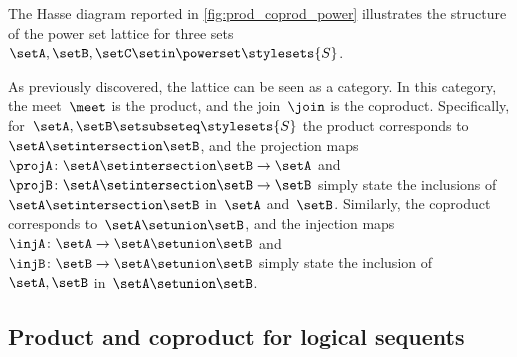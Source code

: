 \begin{marginfigure}
    \centering
    \caption{}
    \label{fig:prod_coprod_power}
\end{marginfigure}

The Hasse diagram reported in \cref{fig:prod_coprod_power} illustrates the structure of the power set lattice for three sets~$\setA,\setB,\setC\setin \powerset \stylesets{S}$.

As previously discovered, the lattice can be seen as a category.
In this category, the meet~$\meet$ is the product, and the join~$\join$ is the coproduct.
Specifically, for~$\setA,\setB\setsubseteq\stylesets{S}$ the product corresponds to~$\setA\setintersection \setB$, and the projection maps~$\projA\colon \setA\setintersection \setB\to \setA$ and~$\projB\colon \setA\setintersection \setB\to \setB$ simply state the inclusions of~$\setA\setintersection \setB$ in~$\setA$ and~$\setB$.
Similarly, the coproduct corresponds to~$\setA\setunion \setB$, and the injection maps~$\injA\colon \setA\to \setA\setunion \setB$ and~$\injB\colon \setB\to \setA\setunion \setB$ simply state the inclusion of~$\setA,\setB$ in~$\setA\setunion \setB$.

\subsection{Product and coproduct for logical sequents}

